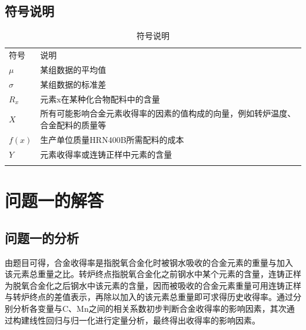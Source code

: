 \documentclass{xcumcmart}
\begin{document}
\subsection{符号说明}
\begin{table}[htbp]
	\centering
	\begin{tabu}{l l}
		\tabucline[1.5pt]{-}
		符号 & 说明\\
		\tabucline[1.5pt]{-}
		$\mu$ & 某组数据的平均值\\
		$\sigma$ & 某组数据的标准差\\
		$R_x$ & 元素x在某种化合物配料中的含量\\
		$X$ & 所有可能影响合金元素收得率的因素的值构成的向量，例如转炉温度、合金配料的质量等\\
		$f(x)$ & 生产单位质量HRN400B所需配料的成本\\
		$Y$ & 元素收得率或连铸正样中元素的含量\\
		\tabucline[1.5pt]{-}
	\end{tabu}
	\caption{符号说明\label{tb:fuhao}}
\end{table}

\section{问题一的解答}
\subsection{问题一的分析}
\par 由题目可得，合金收得率是指脱氧合金化时被钢水吸收的合金元素的重量与加入 该元素总重量之比。转炉终点指脱氧合金化之前钢水中某个元素的含量，连铸正样为脱氧合金化之后钢水中该元素的含量，因而被吸收的合金元素重量可用连铸正样与转炉终点的差值表示，再除以加入的该元素总重量即可求得历史收得率。通过分别分析各变量与C、Mn之间的相关系数初步判断合金收得率的影响因素，其次通过构建线性回归与归一化进行定量分析，最终得出收得率的影响因素。
\end{document}
